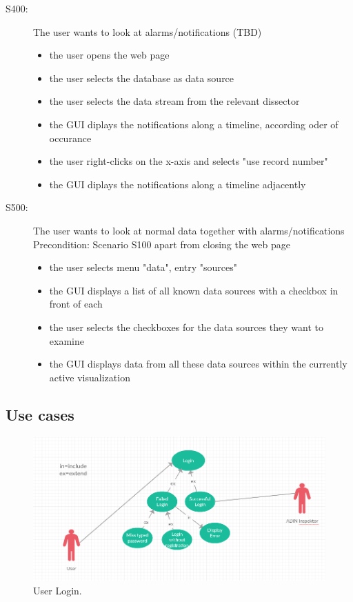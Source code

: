 \documentclass[twoside, english, draft]{Pflichtenheft}
\begin{document}
\begin{description}
	\item[S400:] The user wants to look at alarms/notifications (TBD)
	      \begin{itemize}
		      \item{the user opens the web page}
		      \item{the user selects the database as data source}
		      \item{the user selects the data stream from the relevant dissector}
		      \item{the GUI diplays the notifications along a timeline, according oder of occurance}
		      \item{the user right-clicks on the x-axis and selects "use record number"}
		      \item{the GUI diplays the notifications along a timeline adjacently}
	      \end{itemize}



	\item[S500:] The user wants to look at normal data together with alarms/notifications
	      \\
	      Precondition: Scenario S100 apart from closing the web page
	      \begin{itemize}
		      \item{the user selects menu "data", entry "sources"}
		      \item{the GUI displays a list of all known data sources with a checkbox in front of each}
		      \item{the user selects the checkboxes for the data sources they want to examine}
		      \item{the GUI displays data from all these data sources within the currently active visualization}
	      \end{itemize}


\end{description}

\subsection{Use cases}
\begin{figure}[h]
	\centering
	\includegraphics[width=\textwidth]{Images/login.PNG}
	\caption{User Login.}
\end{figure}
  
\end{document}
